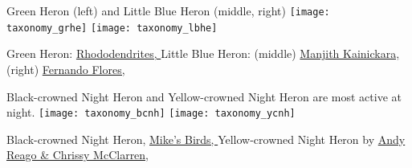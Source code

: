 \documentclass[t]{beamer}
\begin{document}
\begin{frame}{Green Heron (left) and Little Blue Heron (middle, right)}
\texttt{[image: taxonomy\_grhe]}\hfill 
\texttt{[image: taxonomy\_lbhe]}

\vfilll

\tiny Green Heron: \href{https://commons.wikimedia.org/wiki/File:Green_heron_in_PP_(14296).jpg}{Rhododendrites, } \hfill Little Blue Heron: (middle) \href{https://flickr.com/photos/manjithkaini/4686037391}{Manjith Kainickara, }\hfill (right) \href{https://flickr.com/photos/ferjflores/10765140464}{Fernando Flores, }
\end{frame}

\begin{frame}{Black-crowned Night Heron and Yellow-crowned Night Heron are most active at night.}
\texttt{[image: taxonomy\_bcnh]} \hfill
\texttt{[image: taxonomy\_ycnh]}

\vfilll

\tiny Black-crowned Night Heron, \href{https://flickr.com/photos/pazzani/6021109879}{Mike's Birds, } \hfill Yellow-crowned Night Heron by \href{https://flickr.com/photos/wildreturn/51220695991}{Andy Reago \& Chrissy McClarren, }
\end{frame}
\end{document}
